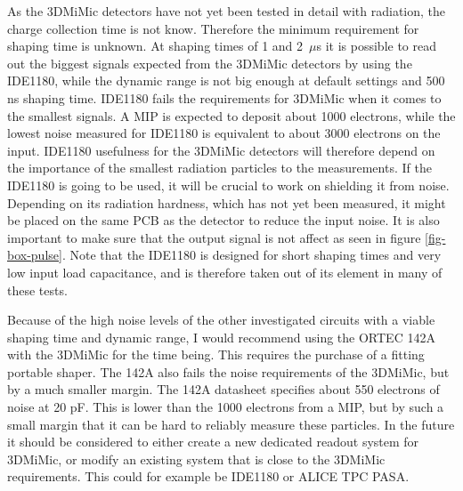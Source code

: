 \documentclass[../main/thesis.tex]{subfiles}
\begin{document}
As the 3DMiMic detectors have not yet been tested in detail with radiation, the charge collection time is not know. Therefore the minimum requirement for shaping time is unknown. At shaping times of 1 and 2~$\mu$s it is possible to read out the biggest signals expected from the 3DMiMic detectors by using the IDE1180, while the dynamic range is not big enough at default settings and 500 ns shaping time. IDE1180 fails the requirements for 3DMiMic when it comes to the smallest signals. A \acrlong{MIP} is expected to deposit about 1000 electrons, while the lowest noise measured for IDE1180 is equivalent to about 3000 electrons on the input. IDE1180 usefulness for the 3DMiMic detectors will therefore depend on the importance of the smallest radiation particles to the measurements. If the IDE1180 is going to be used, it will be crucial to work on shielding it from noise. Depending on its radiation hardness, which has not yet been measured, it might be placed on the same PCB as the detector to reduce the input noise. It is also important to make sure that the output signal is not affect as seen in figure \ref{fig-box-pulse}. Note that the IDE1180 is designed for short shaping times and very low input load capacitance, and is therefore taken out of its element in many of these tests. 

Because of the high noise levels of the other investigated circuits with a viable shaping time and dynamic range, I would recommend using the ORTEC 142A with the 3DMiMic for the time being. This requires the purchase of a fitting portable shaper. The 142A also fails the noise requirements of the 3DMiMic, but by a much smaller margin. The 142A datasheet specifies about 550 electrons of noise at 20 pF. This is lower than the 1000 electrons from a \gls{MIP}, but by such a small margin that it can be hard to reliably measure these particles. In the future it should be considered to either create a new dedicated readout system for 3DMiMic, or modify an existing system that is close to the 3DMiMic requirements. This could for example be IDE1180 or ALICE TPC PASA. 

\end{document}
